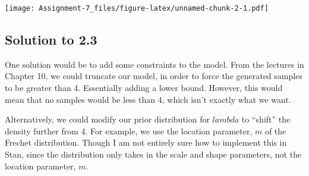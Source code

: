 \documentclass[
]{article}
\begin{document}
\texttt{[image: Assignment-7\_files/figure-latex/unnamed-chunk-2-1.pdf]}

\hypertarget{solution-to-2.3}{%
\subsection{Solution to 2.3}\label{solution-to-2.3}}

One solution would be to add some constraints to the model. From the
lectures in Chapter 10, we could truncate our model, in order to force
the generated samples to be greater than 4. Essentially adding a lower
bound. However, this would mean that no samples would be less than 4,
which isn't exactly what we want.

Alternatively, we could modify our prior distribution for \(lambda\) to
``shift'' the density further from 4. For example, we use the location
parameter, \(m\) of the Frechet distribution. Though I am not entirely
sure how to implement this in Stan, since the distribution only takes in
the scale and shape parameters, not the location parameter, \(m\).
\end{document}
